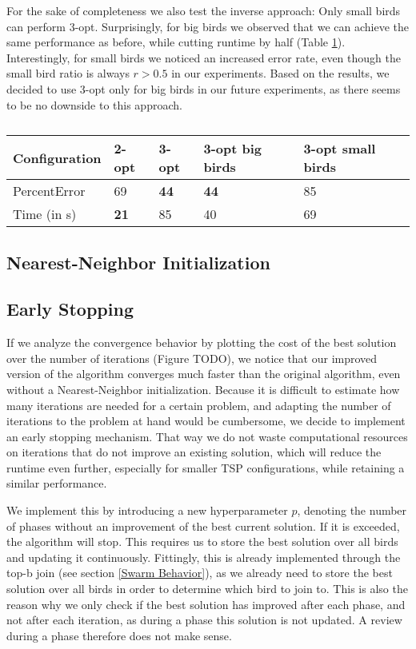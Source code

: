 For the sake of completeness we also test the inverse approach: Only small birds can perform 3-opt.
Surprisingly, for big birds we observed that we can achieve the same performance as before, while
cutting runtime by half (Table \ref{3_opt_big_small_performance}). Interestingly, for small birds
we noticed an increased error rate, even though the small bird ratio is always $r > 0.5$ in our experiments.
Based on the results, we decided to use 3-opt only for big birds in our future experiments, as there
seems to be no downside to this approach.

\begin{table}[h!]
\centering
\begin{tabular}{ |p{2cm}||p{0.75cm}|p{0.75cm}|p{0.75cm}|p{0.75cm}|  }
 \hline
 Configuration& 2-opt & 3-opt & \textbf{3-opt big birds} & 3-opt small birds\\
 \hline \hline
PercentError & 69 & \textbf{44} & \textbf{44} & 85\\
 \hline
 Time (in s) & \textbf{21} & 85 & 40 & 69\\
 \hline
\end{tabular}
\caption{}
\label{3_opt_big_small_performance}
\end{table}

\subsection{Nearest-Neighbor Initialization}
\subsection{Early Stopping}
If we analyze the convergence behavior by plotting the cost of the best solution over the number of iterations
(Figure TODO),
we notice that our improved version of the algorithm converges much faster than the original algorithm,
even without a Nearest-Neighbor initialization. Because it is difficult to estimate how many iterations
are needed for a certain problem, and adapting the number of iterations to the problem at hand would
be cumbersome, we decide to implement an early stopping mechanism.
That way we do not waste computational resources on iterations that do not improve an existing solution,
which will reduce the runtime even further, especially for smaller TSP configurations, while retaining
a similar performance.

We implement this by introducing a new hyperparameter $p$, denoting the number of phases
without an improvement of the best current solution. If it is exceeded, the algorithm will stop.
This requires us to store the best solution over all birds and updating it continuously.
Fittingly, this is already implemented through the top-b join (see section \ref{Swarm Behavior}),
as we already need to store the best solution over all birds in order to determine which bird
to join to. This is also the reason why we only check if the best solution has improved after each phase,
and not after each iteration, as during a phase this solution is not updated.
A review during a phase therefore does not make sense.

